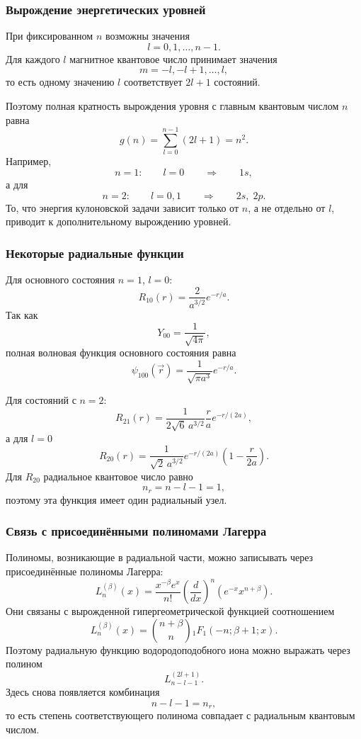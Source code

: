 \documentclass[12pt,a4paper]{article}
\begin{document}
\subsubsection{Вырождение энергетических уровней}

При фиксированном $n$ возможны значения
\[
    l=0,1,\ldots,n-1.
\]
Для каждого $l$ магнитное квантовое число принимает значения
\[
    m=-l,-l+1,\ldots,l,
\]
то есть одному значению $l$ соответствует $2l+1$ состояний.

Поэтому полная кратность вырождения уровня с главным квантовым числом
$n$ равна
\[
    \boxed{
    g(n)
    =
    \sum_{l=0}^{n-1}(2l+1)
    =
    n^2
    }.
\]
Например,
\[
    n=1:
    \qquad
    l=0
    \qquad
    \Rightarrow
    \qquad
    1s,
\]
а для
\[
    n=2:
    \qquad
    l=0,1
    \qquad
    \Rightarrow
    \qquad
    2s,\;2p.
\]
То, что энергия кулоновской задачи зависит только от $n$, а не отдельно
от $l$, приводит к дополнительному вырождению уровней.

\subsubsection{Некоторые радиальные функции}

Для основного состояния $n=1$, $l=0$:
\[
    \boxed{
        R_{10}(r)
        =
        \frac{2}{a^{3/2}}e^{-r/a}
    }.
\]
Так как
\[
    Y_{00}=\frac{1}{\sqrt{4\pi}},
\]
полная волновая функция основного состояния равна
\[
    \boxed{
        \psi_{100}(\vec r)
        =
        \frac{1}{\sqrt{\pi a^3}}e^{-r/a}
    }.
\]

Для состояний с $n=2$:
\[
    \boxed{
    R_{21}(r)
    =
    \frac{1}{2\sqrt6\,a^{3/2}}
    \frac{r}{a}
    e^{-r/(2a)}
    },
\]
а для $l=0$
\[
    \boxed{
    R_{20}(r)
    =
    \frac{1}{\sqrt2\,a^{3/2}}
    e^{-r/(2a)}
    \left(
        1-\frac{r}{2a}
    \right)
    }.
\]
Для $R_{20}$ радиальное квантовое число равно
\[
    n_r=n-l-1=1,
\]
поэтому эта функция имеет один радиальный узел.

\subsubsection{Связь с присоединёнными полиномами Лагерра}

Полиномы, возникающие в радиальной части, можно записывать через
присоединённые полиномы Лагерра:
\[
    \boxed{
    L_n^{(\beta)}(x)
    =
    \frac{x^{-\beta}e^x}{n!}
    \left(
        \frac{d}{dx}
    \right)^n
    \left(
        e^{-x}x^{n+\beta}
    \right)
    }.
\]
Они связаны с вырожденной гипергеометрической функцией соотношением
\[
    \boxed{
    L_n^{(\beta)}(x)
    =
    \binom{n+\beta}{n}
    {}_1F_1(-n;\beta+1;x)
    }.
\]
Поэтому радиальную функцию водородоподобного иона можно выражать через
полином
\[
    L_{n-l-1}^{(2l+1)}.
\]
Здесь снова появляется комбинация
\[
    n-l-1=n_r,
\]
то есть степень соответствующего полинома совпадает с радиальным
квантовым числом.
\end{document}
